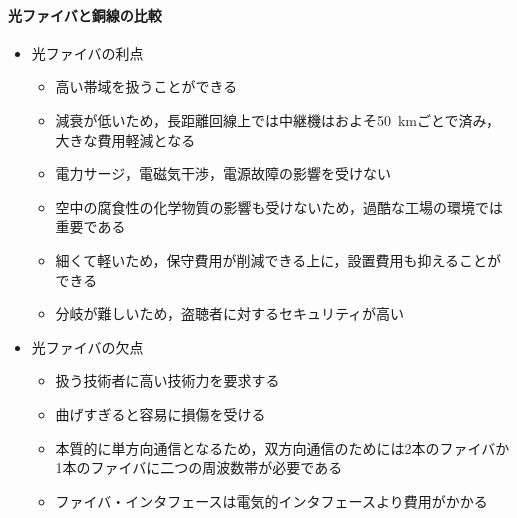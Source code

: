 \documentclass[a4paper]{ltjsarticle}
\begin{document}
			\paragraph{光ファイバと銅線の比較}
				\begin{itemize}
					\item 光ファイバの利点
					\begin{itemize}
						\item 高い帯域を扱うことができる
						\item 減衰が低いため，長距離回線上では中継機はおよそ\SI{50}{km}ごとで済み，大きな費用軽減となる
						\item 電力サージ，電磁気干渉，電源故障の影響を受けない
						\item 空中の腐食性の化学物質の影響も受けないため，過酷な工場の環境では重要である
						\item 細くて軽いため，保守費用が削減できる上に，設置費用も抑えることができる
						\item 分岐が難しいため，盗聴者に対するセキュリティが高い
					\end{itemize}
					\item 光ファイバの欠点
					\begin{itemize}
						\item 扱う技術者に高い技術力を要求する
						\item 曲げすぎると容易に損傷を受ける
						\item 本質的に単方向通信となるため，双方向通信のためには2本のファイバか1本のファイバに二つの周波数帯が必要である
						\item ファイバ・インタフェースは電気的インタフェースより費用がかかる
					\end{itemize}
				\end{itemize}
\end{document}
